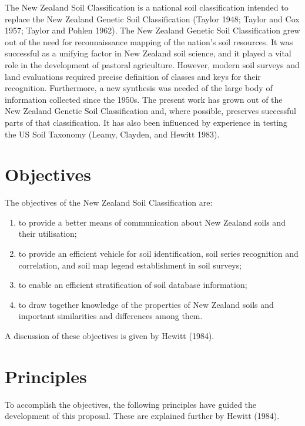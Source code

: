 \documentclass[
  letterpaper,
  DIV=11,
  numbers=noendperiod]{scrreprt}
\providecommand{\tightlist}{%
  \setlength{\itemsep}{0pt}\setlength{\parskip}{0pt}}\usepackage{longtable,booktabs,array}
\begin{document}
The New Zealand Soil Classification is a national soil classification
intended to replace the New Zealand Genetic Soil Classification (Taylor
1948; Taylor and Cox 1957; Taylor and Pohlen 1962). The New Zealand
Genetic Soil Classification grew out of the need for reconnaissance
mapping of the nation's soil resources. It was successful as a unifying
factor in New Zealand soil science, and it played a vital role in the
development of pastoral agriculture. However, modern soil surveys and
land evaluations required precise definition of classes and keys for
their recognition. Furthermore, a new synthesis was needed of the large
body of information collected since the 1950s. The present work has
grown out of the New Zealand Genetic Soil Classification and, where
possible, preserves successful parts of that classification. It has also
been influenced by experience in testing the US Soil Taxonomy (Leamy,
Clayden, and Hewitt 1983).

\hypertarget{sec-intro-objectives}{%
\section{Objectives}\label{sec-intro-objectives}}

The objectives of the New Zealand Soil Classification are:

\begin{enumerate}
\def\labelenumi{\arabic{enumi}.}
\tightlist
\item
  to provide a better means of communication about New Zealand soils and
  their utilisation;
\item
  to provide an efficient vehicle for soil identification, soil series
  recognition and correlation, and soil map legend establishment in soil
  surveys;
\item
  to enable an efficient stratification of soil database information;
\item
  to draw together knowledge of the properties of New Zealand soils and
  important similarities and differences among them.
\end{enumerate}

A discussion of these objectives is given by Hewitt (1984).

\hypertarget{sec-intro-principles}{%
\section{Principles}\label{sec-intro-principles}}

To accomplish the objectives, the following principles have guided the
development of this proposal. These are explained further by Hewitt
(1984).
\end{document}
